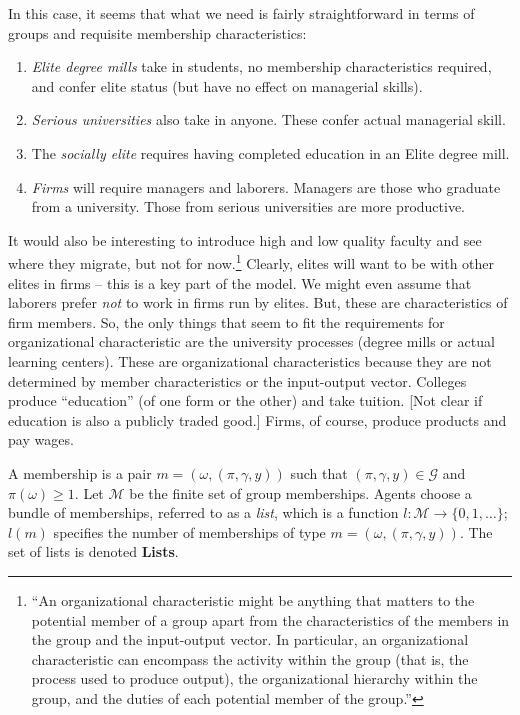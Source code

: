 \documentclass[12pt,letterpaper]{article}
\begin{document}
	In this case, it seems that what we need is fairly straightforward in terms of groups and requisite membership characteristics:
	\begin{enumerate}
		\item \textit{Elite degree mills} take in students, no membership characteristics required, and confer elite status (but have no effect on managerial skills). 
		\item \textit{Serious universities} also take in anyone. These confer actual managerial skill.
		\item The \textit{socially elite} requires having completed education in an Elite degree mill.
		\item \textit{Firms} will require managers and laborers. Managers are those who graduate from a university. Those from serious universities are more productive. 
	\end{enumerate}
	It would also be interesting to introduce high and low quality faculty and see where they migrate, but not for now.\footnote
	{ 
		``An organizational characteristic might be anything that matters to the potential member of a group apart from the characteristics of the members in the group and the input-output vector. In particular, an organizational characteristic can encompass the activity within the group (that is, the process used to produce output), the organizational hierarchy within the group, and the duties of each potential member of the group.''
	}
	Clearly, elites will want to be with other elites in firms -- this is a key part of the model. 
	We might even assume that laborers prefer \textit{not} to work in firms run by elites.
	But, these are characteristics of firm members.
	So, the only things that seem to fit the requirements for organizational characteristic are the university processes (degree mills or actual learning centers).
	These are organizational characteristics because they are not determined by member characteristics or the input-output vector.
	Colleges produce ``education'' (of one form or the other) and take tuition.
	[Not clear if education is also a publicly traded good.]
	Firms, of course, produce products and pay wages.
	
	A membership is a pair $m=(\omega,(\pi,\gamma,y))$ such that $(\pi,\gamma,y)\in\mathcal{G}$ and $\pi(\omega)\ge 1$. Let $\mathcal{M}$ be the finite set of group memberships. Agents choose a bundle of memberships, referred to as a \textit{list}, which is a function $l:\mathcal{M}\rightarrow\{0,1,\ldots\}$; $l(m)$ specifies the number of memberships of type $m=(\omega,(\pi,\gamma,y))$.
	The set of lists is denoted \textbf{Lists}.
	
\end{document}
